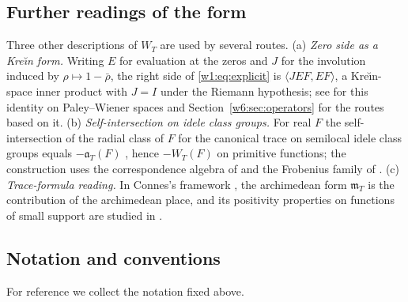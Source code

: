\documentclass[11pt]{amsart}
\theoremstyle{definition}
\theoremstyle{remark}
\numberwithin{equation}{section}
\newcommand{\mT}{\mathfrak{m}_T}                       %
\newcommand{\aT}{\mathfrak{a}_T}                       %
\newcommand{\WT}{W_T}                                  %
\begin{document}
\subsection{Further readings of the form}
Three other descriptions of $\WT$ are used by several routes.
(a) \emph{Zero side as a Kre\u{\i}n form.} Writing $E$ for evaluation at the
zeros and $J$ for the involution induced by $\rho\mapsto1-\bar\rho$, the right
side of \eqref{w1:eq:explicit} is $\langle JEF,EF\rangle$, a Kre\u{\i}n-space
inner product with $J=I$ under the Riemann hypothesis; see
\cite[Proposition~6.1]{P08} for this identity on Paley--Wiener spaces and
Section~\ref{w6:sec:operators} for the routes based on it.
(b) \emph{Self-intersection on idele class groups.} For real $F$ the
self-intersection of the radial class of $F$ for the canonical trace on
semilocal idele class groups equals $-\aT(F)$ \cite[Theorem~4.1(ii)]{P45},
hence $-\WT(F)$ on primitive functions; the construction uses the
correspondence algebra of \cite{P43} and the Frobenius family of \cite{P44}.
(c) \emph{Trace-formula reading.} In Connes's framework \cite{Connes1999},
the archimedean form $\mT$ is the contribution of the archimedean place, and
its positivity properties on functions of small support are studied in
\cite{ConnesConsani2021}.

\subsection{Notation and conventions}\label{w1:subsec:notation}
For reference we collect the notation fixed above.
\end{document}
